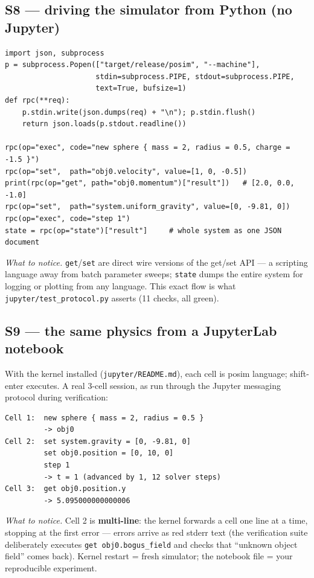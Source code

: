 \documentclass[11pt]{article}
\newcommand{\code}[1]{\texttt{#1}}
\begin{document}
\subsection{S8 --- driving the simulator from Python (no Jupyter)}

\begin{lstlisting}
import json, subprocess
p = subprocess.Popen(["target/release/posim", "--machine"],
                     stdin=subprocess.PIPE, stdout=subprocess.PIPE,
                     text=True, bufsize=1)
def rpc(**req):
    p.stdin.write(json.dumps(req) + "\n"); p.stdin.flush()
    return json.loads(p.stdout.readline())

rpc(op="exec", code="new sphere { mass = 2, radius = 0.5, charge = -1.5 }")
rpc(op="set",  path="obj0.velocity", value=[1, 0, -0.5])
print(rpc(op="get", path="obj0.momentum")["result"])   # [2.0, 0.0, -1.0]
rpc(op="set",  path="system.uniform_gravity", value=[0, -9.81, 0])
rpc(op="exec", code="step 1")
state = rpc(op="state")["result"]     # whole system as one JSON document
\end{lstlisting}

\emph{What to notice.} \code{get}/\code{set} are direct wire versions
of the get/set API --- a scripting language away from batch parameter
sweeps; \code{state} dumps the entire system for logging or plotting
from any language. This exact flow is what
\code{jupyter/test\_protocol.py} asserts (11 checks, all green).

\subsection{S9 --- the same physics from a JupyterLab notebook}

With the kernel installed (\code{jupyter/README.md}), each cell is
posim language; shift-enter executes. A real 3-cell session, as run
through the Jupyter messaging protocol during verification:

\begin{lstlisting}
Cell 1:  new sphere { mass = 2, radius = 0.5 }
         -> obj0
Cell 2:  set system.gravity = [0, -9.81, 0]
         set obj0.position = [0, 10, 0]
         step 1
         -> t = 1 (advanced by 1, 12 solver steps)
Cell 3:  get obj0.position.y
         -> 5.095000000000006
\end{lstlisting}

\emph{What to notice.} Cell 2 is \textbf{multi-line}: the kernel
forwards a cell one line at a time, stopping at the first error ---
errors arrive as red stderr text (the verification suite deliberately
executes \code{get obj0.bogus\_field} and checks that ``unknown object
field'' comes back). Kernel restart = fresh simulator; the notebook
file = your reproducible experiment.
\end{document}
